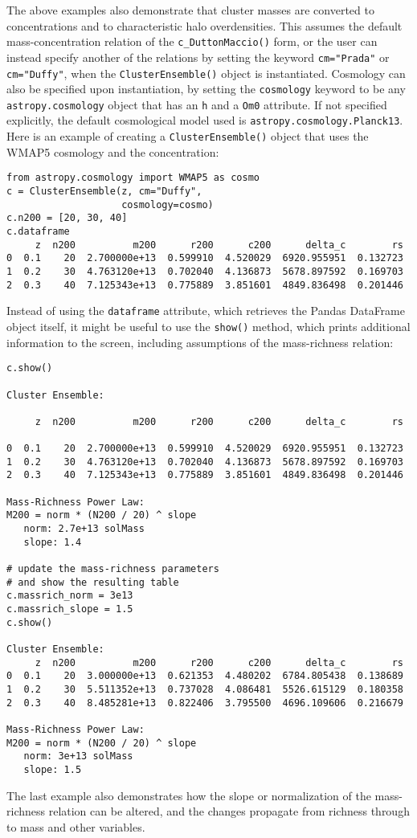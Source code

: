 \documentclass[twocolumn]{aastex6}
\newcommand{\code}{\lstinline[style=codeintext]}
\begin{document}
The above examples also demonstrate that cluster masses are converted to concentrations and to characteristic halo overdensities. This assumes the default mass-concentration relation of the \code{c_DuttonMaccio()} form, or the user can instead specify another of the relations by setting the keyword \code{cm="Prada"} or \code{cm="Duffy"}, when the \code{ClusterEnsemble()} object is instantiated. Cosmology can also be specified upon instantiation, by setting the \code{cosmology} keyword to be any \code{astropy.cosmology} object that has an \code{h} and a \code{Om0} attribute. If not specified explicitly, the default cosmological model used is \code{astropy.cosmology.Planck13}. Here is an example of creating a \code{ClusterEnsemble()} object that uses the WMAP5 cosmology \citep{WMAP5} and the \citet{Duffy08} concentration:
\begin{lstlisting}
from astropy.cosmology import WMAP5 as cosmo
c = ClusterEnsemble(z, cm="Duffy",
                    cosmology=cosmo)
c.n200 = [20, 30, 40]
c.dataframe
     z  n200          m200      r200      c200      delta_c        rs
0  0.1    20  2.700000e+13  0.599910  4.520029  6920.955951  0.132723
1  0.2    30  4.763120e+13  0.702040  4.136873  5678.897592  0.169703
2  0.3    40  7.125343e+13  0.775889  3.851601  4849.836498  0.201446
\end{lstlisting}
Instead of using the \code{dataframe} attribute, which retrieves the Pandas DataFrame object itself, it might be useful to use the \code{show()} method, which prints additional information to the screen, including assumptions of the mass-richness relation:
\begin{lstlisting}
c.show()

Cluster Ensemble:

     z  n200          m200      r200      c200      delta_c        rs

0  0.1    20  2.700000e+13  0.599910  4.520029  6920.955951  0.132723
1  0.2    30  4.763120e+13  0.702040  4.136873  5678.897592  0.169703
2  0.3    40  7.125343e+13  0.775889  3.851601  4849.836498  0.201446

Mass-Richness Power Law:
M200 = norm * (N200 / 20) ^ slope
   norm: 2.7e+13 solMass
   slope: 1.4

# update the mass-richness parameters
# and show the resulting table
c.massrich_norm = 3e13
c.massrich_slope = 1.5
c.show()

Cluster Ensemble:
     z  n200          m200      r200      c200      delta_c        rs
0  0.1    20  3.000000e+13  0.621353  4.480202  6784.805438  0.138689
1  0.2    30  5.511352e+13  0.737028  4.086481  5526.615129  0.180358
2  0.3    40  8.485281e+13  0.822406  3.795500  4696.109606  0.216679

Mass-Richness Power Law:
M200 = norm * (N200 / 20) ^ slope
   norm: 3e+13 solMass
   slope: 1.5

\end{lstlisting}
The last example also demonstrates how the slope or normalization of the mass-richness relation can be altered, and the changes propagate from richness through to mass and other variables.
\end{document}
